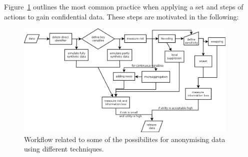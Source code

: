 \documentclass[12pt]{article}
\begin{document}
Figure~\ref{fig:ablauf} outlines the most common practice 
when applying a set and steps of actions to gain confidential data. These steps are motivated in the following:

\begin{figure}[ht]
\begin{center}
\includegraphics[width=0.95\textwidth]{ablauf}
\caption{\label{fig:ablauf}Workflow related to some of the possibilites for anonymising data using different techniques.}
\end{center}
\end{figure}
\end{document}

